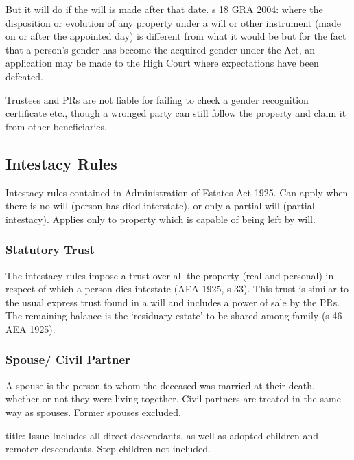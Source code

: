 \documentclass[
]{article}
\newenvironment{Shaded}{}{}
\newcommand{\NormalTok}[1]{#1}
\begin{document}
But it will do if the will is made after that date. s 18 GRA 2004: where
the disposition or evolution of any property under a will or other
instrument (made on or after the appointed day) is different from what
it would be but for the fact that a person's gender has become the
acquired gender under the Act, an application may be made to the High
Court where expectations have been defeated.

Trustees and PRs are not liable for failing to check a gender
recognition certificate etc., though a wronged party can still follow
the property and claim it from other beneficiaries.

\hypertarget{intestacy-rules}{%
\subsection{Intestacy Rules}\label{intestacy-rules}}

Intestacy rules contained in Administration of Estates Act 1925. Can
apply when there is no will (person has died interstate), or only a
partial will (partial intestacy). Applies only to property which is
capable of being left by will.

\hypertarget{statutory-trust}{%
\subsubsection{Statutory Trust}\label{statutory-trust}}

The intestacy rules impose a trust over all the property (real and
personal) in respect of which a person dies intestate (AEA 1925, s 33).
This trust is similar to the usual express trust found in a will and
includes a power of sale by the PRs. The remaining balance is the
`residuary estate' to be shared among family (s 46 AEA 1925).

\hypertarget{spouse-civil-partner}{%
\subsubsection{Spouse/ Civil Partner}\label{spouse-civil-partner}}

A spouse is the person to whom the deceased was married at their death,
whether or not they were living together. Civil partners are treated in
the same way as spouses. Former spouses excluded.

\begin{Shaded}
\begin{Highlighting}[]
\NormalTok{title: Issue}
\NormalTok{Includes all direct descendants, as well as adopted children and remoter descendants. Step children not included. }
\end{Highlighting}
\end{Shaded}
\end{document}
